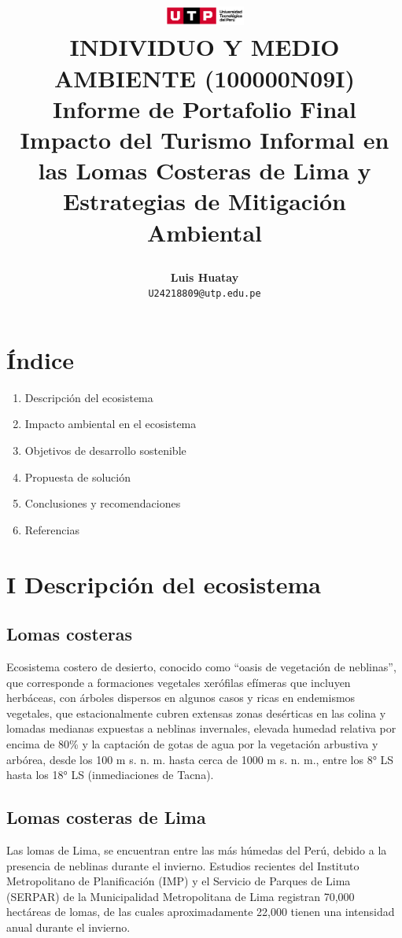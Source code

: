 \documentclass[a4paper,11pt]{article}
\title{
    \begin{center}
        \includegraphics[width=0.2\textwidth]{./logotipo-principal-rgb-color-2_904941-2048x492.png}\\ %
        \vspace{1cm}
        \large \textbf{INDIVIDUO Y MEDIO AMBIENTE (100000N09I)}\\
        \vspace{1cm}
        \large \textbf{Informe de Portafolio Final}\\
        \vspace{7cm}
        \Huge \textbf{Impacto del Turismo Informal en las Lomas Costeras de Lima y Estrategias de Mitigación Ambiental}
    \end{center}
}
\author{
    \textbf{Luis Huatay}\\
    \texttt{U24218809@utp.edu.pe}
}
\date{}
\begin{document}
\maketitle

\newpage

\section*{Índice}
\begin{enumerate}[label=\Roman*.]
    \item Descripción del ecosistema
    \item Impacto ambiental en el ecosistema
    \item Objetivos de desarrollo sostenible
    \item Propuesta de solución
    \item Conclusiones y recomendaciones
    \item Referencias
\end{enumerate}

\newpage

\section{I Descripción del ecosistema}
\subsection{Lomas costeras}
Ecosistema costero de desierto, conocido como “oasis de vegetación de neblinas”, 
que corresponde a formaciones vegetales xerófilas efímeras que incluyen herbáceas, 
con árboles dispersos en algunos casos y ricas en endemismos vegetales, que 
estacionalmente cubren extensas zonas desérticas en las colina y lomadas medianas 
expuestas a neblinas invernales, elevada humedad relativa por encima de 80\% y la 
captación de gotas de agua por la vegetación arbustiva y arbórea, desde los 100 m 
s. n. m. hasta cerca de 1000 m s. n. m., entre los 8° LS hasta los 18° LS (inmediaciones 
de Tacna).
\subsection{Lomas costeras de Lima}
Las lomas de Lima, se encuentran entre las más húmedas del Perú, debido a la presencia de neblinas durante el invierno. Estudios recientes del Instituto Metropolitano de Planificación (IMP) y el Servicio de Parques de Lima (SERPAR) de la 
Municipalidad Metropolitana de Lima registran 70,000 hectáreas de lomas, de las cuales aproximadamente 22,000 tienen una intensidad anual durante el invierno.
\end{document}
